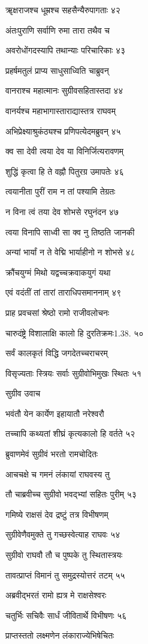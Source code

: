 ॠक्षराजश्च धूम्रश्च सहसैन्यैरुपागताः ४२

अंतःपुराणि सर्वाणि रुमा तारा तथैव च

अवरोधोंगदस्यापि तथान्याः परिचारिकाः ४३

प्रहर्षमतुलं प्राप्य साधुसाध्विति चाब्रुवन्

वानराश्च महात्मानः सुग्रीवसहितास्तदा ४४

वानर्यश्च महाभागास्ताराद्यास्तत्र राघवम्

अभिप्रेक्ष्याश्रुकंठ्यश्च प्रणिपत्येदमब्रुवन् ४५

क्व सा देवी त्वया देव या विनिर्जित्यरावणम्

शुद्धिं कृत्वा हि ते वह्नौ पितुरग्र उमापतेः ४६

त्वयानीता पुरीं राम न तां पश्यामि तेग्रतः

न विना त्वं तया देव शोभसे रघुनंदन ४७

त्वया विनापि साध्वी सा क्व नु तिष्ठति जानकी

अन्यां भार्यां न ते वेद्मि भार्याहीनो न शोभसे ४८

क्रौंचयुग्मं मिथो यद्वच्चक्रवाकयुगं यथा

एवं वदंतीं तां तारां ताराधिपसमाननाम् ४९

प्राह प्रवचसां श्रेष्ठो रामो राजीवलोचनः

चारुदंष्ट्रे विशालाक्षि कालो हि दुरतिक्रमः1.38. ५०

सर्वं कालकृतं विद्धि जगदेतच्चराचरम्

विसृज्यताः स्त्रियः सर्वाः सुग्रीवोभिमुखः स्थितः ५१

सुग्रीव उवाच

भवंतौ येन कार्येण इहायातौ नरेश्वरौ

तच्चापि कथ्यतां शीघ्रं कृत्यकालो हि वर्तते ५२

ब्रुवाणमेवं सुग्रीवं भरतो रामचोदितः

आचचक्षे च गमनं लंकायां राघवस्य तु

तौ चाब्रवीच्च सुग्रीवो भवद्भ्यां सहितः पुरीम् ५३

गमिष्ये राक्षसं देव द्रष्टुं तत्र विभीषणम्

सुग्रीवेणैवमुक्ते तु गच्छस्वेत्याह राघवः ५४

सुग्रीवो राघवौ तौ च पुष्पके तु स्थितास्त्रयः

तावत्प्राप्तं विमानं तु समुद्रस्योत्तरं तटम् ५५

अब्रवीद्भरतं रामो ह्यत्र मे राक्षसेश्वरः

चतुर्भिः सचिवैः सार्धं जीवितार्थे विभीषणः ५६

प्राप्तस्ततो लक्ष्मणेन लंकाराज्येभिषेचितः

